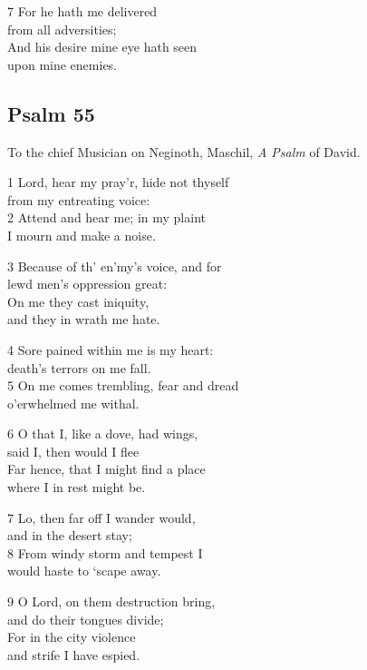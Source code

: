 \begin{multicols}{3}
7 For he hath me delivered\\
from all adversities;\\
And his desire mine eye hath seen\\
upon mine enemies.

\begin{center}
\quad{}\quad{}
\end{center}

\subsection*{Psalm 55}

To the chief Musician on Neginoth, Maschil,
\emph{A Psalm} of David.

1 Lord, hear my pray’r, hide not thyself\\
from my entreating voice:\\
2 Attend and hear me; in my plaint\\
I mourn and make a noise.

3 Because of th’ en’my’s voice, and for\\
lewd men’s oppression great:\\
On me they cast iniquity,\\
and they in wrath me hate.

4 Sore pained within me is my heart:\\
death’s terrors on me fall.\\
5 On me comes trembling, fear and dread\\
o’erwhelmed me withal.

6 O that I, like a dove, had wings,\\
said I, then would I flee\\
Far hence, that I might find a place\\
where I in rest might be.

7 Lo, then far off I wander would,\\
and in the desert stay;\\
8 From windy storm and tempest I\\
would haste to ‘scape away.

9 O Lord, on them destruction bring,\\
and do their tongues divide;\\
For in the city violence\\
and strife I have espied.


\end{multicols}
